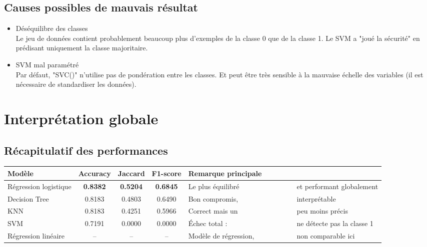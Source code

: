 \documentclass[a4paper,11pt]{article}
\begin{document}
	\newpage
	\subsection{Causes possibles de mauvais résultat}
		\begin{itemize}
		\item Déséquilibre des classes \\
		Le jeu de données contient probablement beaucoup plus d'exemples de la classe 0 que de la classe 1.
		Le SVM a "joué la sécurité" en prédisant uniquement la classe majoritaire.
		
		\item   SVM mal paramétré\\
		Par défaut, "SVC()" n’utilise pas de pondération entre les classes.
		Et peut être très sensible à la mauvaise échelle des variables (il est nécessaire de  standardiser les données).
	\end{itemize}
	
	\newpage
	\vspace{1.5cm}
	\section{Interprétation globale }
	\subsection{Récapitulatif des performances}
	\begin{tabular}{|l|c|c|c|l|}
		\hline
		\textbf{Modèle} & \textbf{Accuracy} & \textbf{Jaccard} & \textbf{F1-score} & \textbf{Remarque principale} \\
		\hline
		Régression logistique & \textbf{0.8382} & \textbf{0.5204} & \textbf{0.6845} & Le plus équilibré	& & & & & et performant globalement \\
		Decision Tree         & 0.8183           & 0.4803           & 0.6490           & Bon compromis,	& & & & & interprétable \\
		KNN                   & 0.8183           & 0.4251           & 0.5966           & Correct mais un	& & & & & peu moins précis \\
		SVM                   & 0.7191           & 0.0000           & 0.0000           & Échec total :	& & & & & ne détecte pas la classe 1 \\
		Régression linéaire    & --               & --               & --               & Modèle de régression,	& & & & & non comparable ici \\
		\hline
	\end{tabular}
	\\
\end{document}
